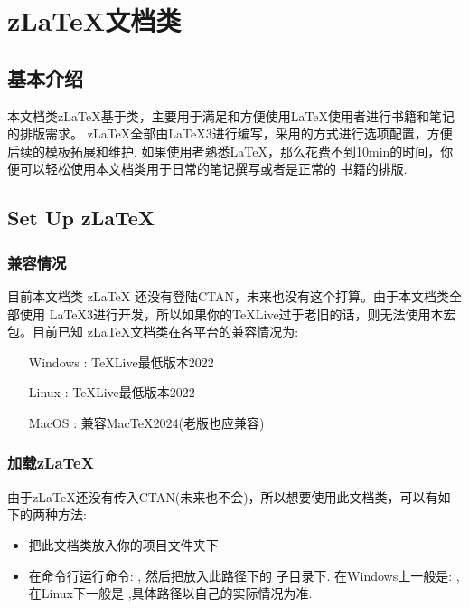 \chapter{z\LaTeX{}文档类}\label{start-use-class}
\section{基本介绍}
本文档类z\LaTeX{}基于类，主要用于满足和方便使用\LaTeX{}使用者进行书籍和笔记的排版需求。
z\LaTeX{}全部由\LaTeX3进行编写，采用的方式进行选项配置，方便后续的模板拓展和维护.
如果使用者熟悉\LaTeX{}，那么花费不到10min的时间，你便可以轻松使用本文档类用于日常的笔记撰写或者是正常的
书籍的排版. 

\section{Set Up z\LaTeX{}}
\subsection{兼容情况}
目前本文档类 z\LaTeX{} 还没有登陆CTAN，未来也没有这个打算。由于本文档类全部使用
\LaTeX3进行开发，所以如果你的\TeX{}Live过于老旧的话，则无法使用本宏包。目前已知
z\LaTeX{}文档类在各平台的兼容情况为:

\hspace*{10em}\parbox{8cm}{
\begin{itemize}
    \item[Windows]: \TeX{}Live最低版本2022
    \item[Linux]: \TeX{}Live最低版本2022
    \item[MacOS]: 兼容Mac{}\TeX{}2024(老版也应兼容) 
\end{itemize}}

\subsection{加载z\LaTeX{}}
由于z\LaTeX{}还没有传入CTAN(未来也不会)，所以想要使用此文档类，可以有如下的两种方法:
\begin{itemize}
    \item 把此文档类放入你的项目文件夹下
    \item 在命令行运行命令: , 然后把放入此路径下的
        子目录下. 在Windows上一般是: , 在Linux下一般是
        ,具体路径以自己的实际情况为准.
\end{itemize}

